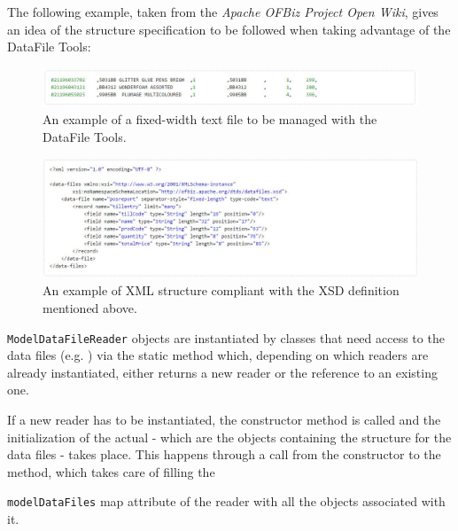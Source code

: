 {The following example, taken from the \textit{Apache OFBiz Project Open Wiki}, gives an idea of the structure specification to be followed when taking advantage of the DataFile Tools:

\begin{figure}[H]
\begin{center}
		\centerline{\includegraphics[width=1.3\textwidth]{./pictures/CSV_text_data_example.JPG}}
		\caption{An example of a fixed-width text file to be managed with the DataFile Tools.}
		\label{text_example}
\end{center}
\end{figure}

\begin{figure}[H]
\begin{center}
		\centerline{\includegraphics[width=1.3\textwidth]{./pictures/XML_structure_example.JPG}}
		\caption{An example of XML structure compliant with the XSD definition mentioned above.}
		\label{text_example}
\end{center}
\end{figure}

\texttt{ModelDataFileReader} objects are instantiated by classes that need access to the data files (e.g. ) via the  static method which, depending on which readers are already instantiated, either returns a new reader or the reference to an existing one.

If a new reader has to be instantiated, the constructor method is called and the initialization of the actual  - which are the objects containing the structure for the data files - takes place. This happens through a call from the constructor to the  method, which takes care of filling the {\texttt{modelDataFiles} map attribute of the reader with all the  objects associated with it.

}}
